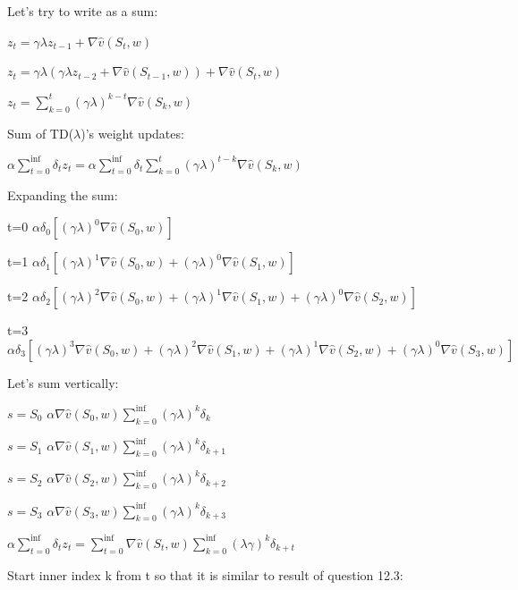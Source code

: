 \documentclass[11pt]{article}
\begin{document}
    \hfill \break
    \noindent Let's try to write as a sum:

    \noindent $ z_{t} = \gamma \lambda z_{t-1} + \nabla \hat{v}(S_t, w) $

    \noindent $ z_{t} = \gamma \lambda ( \gamma \lambda z_{t-2} + \nabla \hat{v}(S_{t-1}, w) ) + \nabla \hat{v}(S_t, w) $

    \noindent $ z_{t} = \sum_{k=0}^{t} (\gamma \lambda )^{k-t} \nabla \hat{v}(S_k, w) $


    \hfill \break
    \noindent Sum of TD($\lambda$)’s weight updates:

    \noindent $ \alpha \sum_{t=0}^{\inf} \delta_t z_t = \alpha \sum_{t=0}^{\inf} \delta_t \sum_{k=0}^{t} (\gamma \lambda )^{t-k} \nabla \hat{v}(S_k, w) $

    \hfill \break
    \noindent Expanding the sum:

    \noindent t=0 $ \alpha \delta_0 [(\gamma \lambda)^0 \nabla\hat{v}(S_0, w)] $

    \noindent t=1 $ \alpha \delta_1 [(\gamma \lambda)^1 \nabla\hat{v}(S_0, w) + (\gamma \lambda)^0 \nabla\hat{v}(S_1, w) ] $

    \noindent t=2 $ \alpha \delta_2 [(\gamma \lambda)^2 \nabla\hat{v}(S_0, w) + (\gamma \lambda)^1 \nabla\hat{v}(S_1, w) + (\gamma \lambda)^0 \nabla\hat{v}(S_2, w) ] $

    \noindent t=3 $ \alpha \delta_3 [(\gamma \lambda)^3 \nabla\hat{v}(S_0, w) + (\gamma \lambda)^2 \nabla\hat{v}(S_1, w) + (\gamma \lambda)^1 \nabla\hat{v}(S_2, w) + (\gamma \lambda)^0 \nabla\hat{v}(S_3, w) ] $

    \hfill \break
    \noindent Let's sum vertically:

    \noindent $s = S_0$ $ \alpha \nabla\hat{v}(S_0, w) \sum_{k=0}^{\inf} (\gamma \lambda)^{k} \delta_{k} $

    \noindent $s = S_1$ $ \alpha \nabla\hat{v}(S_1, w) \sum_{k=0}^{\inf} (\gamma \lambda)^{k} \delta_{k+1} $

    \noindent $s = S_2$ $ \alpha \nabla\hat{v}(S_2, w) \sum_{k=0}^{\inf} (\gamma \lambda)^{k} \delta_{k+2} $

    \noindent $s = S_3$ $ \alpha \nabla\hat{v}(S_3, w) \sum_{k=0}^{\inf} (\gamma \lambda)^{k} \delta_{k+3} $

    \hfill \break
    \noindent $  \alpha \sum_{t=0}^{\inf} \delta_t z_t =  \sum_{t=0}^{\inf} \nabla\hat{v}(S_t, w) \sum_{k=0}^{\inf} (\lambda \gamma)^k \delta_{k+t} $

    \hfill \break
    \noindent Start inner index k from t so that it is similar to result of question 12.3:
\end{document}
